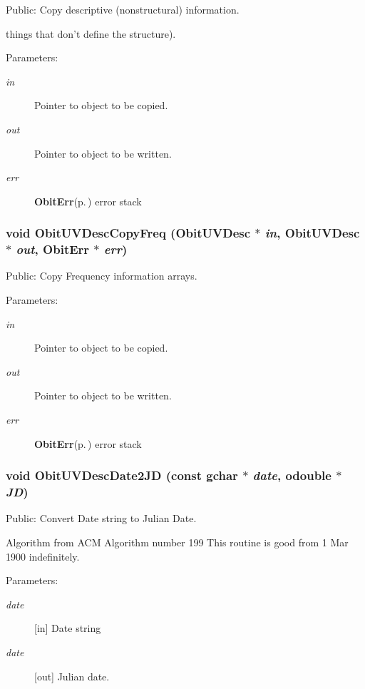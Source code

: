 Public: Copy descriptive (nonstructural) information. 

things that don't define the structure). \begin{Desc}
\item[Parameters:]
\begin{description}
\item[{\em in}]Pointer to object to be copied. \item[{\em out}]Pointer to object to be written. \item[{\em err}]{\bf Obit\-Err}{\rm (p.\,\pageref{structObitErr})} error stack \end{description}
\end{Desc}
\subsubsection{\setlength{\rightskip}{0pt plus 5cm}void Obit\-UVDesc\-Copy\-Freq ({\bf Obit\-UVDesc} $\ast$ {\em in}, {\bf Obit\-UVDesc} $\ast$ {\em out}, {\bf Obit\-Err} $\ast$ {\em err})}\label{ObitUVDesc_8h_a12}


Public: Copy Frequency information arrays. 

\begin{Desc}
\item[Parameters:]
\begin{description}
\item[{\em in}]Pointer to object to be copied. \item[{\em out}]Pointer to object to be written. \item[{\em err}]{\bf Obit\-Err}{\rm (p.\,\pageref{structObitErr})} error stack \end{description}
\end{Desc}
\subsubsection{\setlength{\rightskip}{0pt plus 5cm}void Obit\-UVDesc\-Date2JD (const gchar $\ast$ {\em date}, {\bf odouble} $\ast$ {\em JD})}\label{ObitUVDesc_8h_a16}


Public: Convert Date string to Julian Date. 

Algorithm from ACM Algorithm number 199 This routine is good from 1 Mar 1900 indefinitely. \begin{Desc}
\item[Parameters:]
\begin{description}
\item[{\em date}][in] Date string \item[{\em date}][out] Julian date. \end{description}
\end{Desc}
